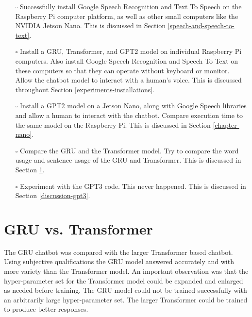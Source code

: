 \begin{itemize}
	\item[\rlap{\raisebox{0.3ex}{\hspace{0.4ex}\tiny \ding{52}}}$\square$] Successfully install Google Speech Recognition and Text To Speech on the Raspberry Pi computer platform, as well as other small computers like the NVIDIA Jetson Nano. This is discussed in Section \ref{speech-and-speech-to-text}.
	
	\item[\rlap{\raisebox{0.3ex}{\hspace{0.4ex}\tiny \ding{52}}}$\square$] Install a GRU, Transformer, and GPT2 model on individual Raspberry Pi computers. Also install Google Speech Recognition and Speech To Text on these computers so that they can operate without keyboard or monitor. Allow the chatbot model to interact with a human's voice. This is discussed throughout Section \ref{experiments-installations}.
	
	\item[\rlap{\raisebox{0.3ex}{\hspace{0.4ex}\tiny \ding{52}}}$\square$] Install a GPT2 model on a Jetson Nano, along with Google Speech libraries and allow a human to interact with the chatbot. Compare execution time to the same model on the Raspberry Pi. This is discussed in Section \ref{chapter-nano}.
	
	\item[\rlap{\raisebox{0.3ex}{\hspace{0.4ex}\tiny \ding{52}}}$\square$] Compare the GRU and the Transformer model. Try to compare the word usage and sentence usage of the GRU and Transformer. This is discussed in Section \ref{gru-vs-transformer}.
	
	\item[\rlap{\raisebox{0.3ex}{\hspace{0.4ex}\scriptsize \ding{56}}}$\square$] Experiment with the GPT3 code. This never happened. This is discussed in Section \ref{discussion-gpt3}.
\end{itemize}


\section{GRU vs. Transformer}
\label{gru-vs-transformer}

The GRU chatbot was compared with the larger Transformer based chatbot. Using subjective qualifications the GRU model answered accurately and with more variety than the Transformer model. An important observation was that the hyper-parameter set for the Transformer model could be expanded and enlarged as needed before training. The GRU model could not be trained successfully with an arbitrarily large hyper-parameter set. The larger Transformer could be trained to produce better responses.

